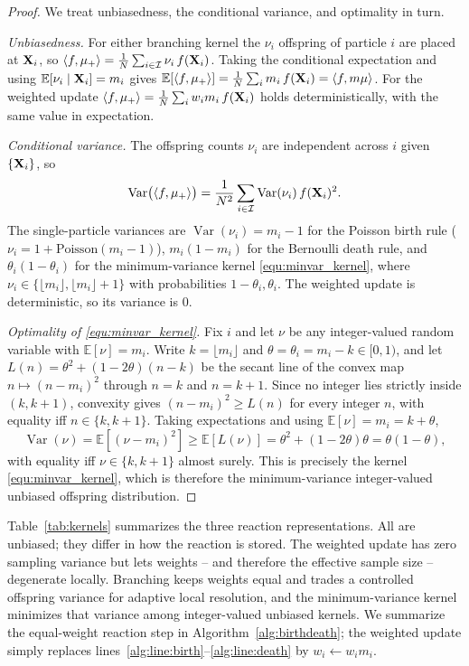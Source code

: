 \documentclass[a4paper,fleqn]{cas-sc}
\theoremstyle{definition}
\theoremstyle{remark}
\begin{document}
\begin{proof}
We treat unbiasedness, the conditional variance, and optimality in turn.

\emph{Unbiasedness.} For either branching kernel the $\nu_i$ offspring of particle $i$ are placed at $\mathbf{X}_i$, so
$\langle f,\mu_+\rangle=\frac1N\sum_{i\in\mathcal I}\nu_i\,f(\mathbf{X}_i)$. Taking the conditional expectation and using
$\mathbb E[\nu_i\mid\mathbf{X}_i]=m_i$ gives
$\mathbb E[\langle f,\mu_+\rangle]=\frac1N\sum_i m_i\,f(\mathbf{X}_i)=\langle f,m\mu\rangle$. For the weighted update
$\langle f,\mu_+\rangle=\frac1N\sum_i w_i m_i\,f(\mathbf{X}_i)$ holds deterministically, with the same value in
expectation.

\emph{Conditional variance.} The offspring counts $\nu_i$ are independent across $i$ given $\{\mathbf{X}_i\}$, so
\[
\operatorname{Var}\!\big(\langle f,\mu_+\rangle\big)
=\frac1{N^2}\sum_{i\in\mathcal I}\operatorname{Var}(\nu_i)\,f(\mathbf{X}_i)^2 .
\]
The single-particle variances are $\operatorname{Var}(\nu_i)=m_i-1$ for the Poisson birth rule
($\nu_i=1+\mathrm{Poisson}(m_i-1)$), $m_i(1-m_i)$ for the Bernoulli death rule, and $\theta_i(1-\theta_i)$ for the
minimum-variance kernel \eqref{equ:minvar_kernel}, where $\nu_i\in\{\lfloor m_i\rfloor,\lfloor m_i\rfloor+1\}$
with probabilities $1-\theta_i,\theta_i$. The weighted update is deterministic, so its variance is $0$.

\emph{Optimality of \eqref{equ:minvar_kernel}.} Fix $i$ and let $\nu$ be any integer-valued random variable with
$\mathbb E[\nu]=m_i$. Write $k=\lfloor m_i\rfloor$ and $\theta=\theta_i=m_i-k\in[0,1)$, and let
$L(n)=\theta^2+(1-2\theta)(n-k)$ be the secant line of the convex map $n\mapsto(n-m_i)^2$ through $n=k$ and
$n=k+1$. Since no integer lies strictly inside $(k,k+1)$, convexity gives $(n-m_i)^2\ge L(n)$ for every integer
$n$, with equality iff $n\in\{k,k+1\}$. Taking expectations and using $\mathbb E[\nu]=m_i=k+\theta$,
\[
\operatorname{Var}(\nu)=\mathbb E[(\nu-m_i)^2]\ge\mathbb E[L(\nu)]
=\theta^2+(1-2\theta)\theta=\theta(1-\theta),
\]
with equality iff $\nu\in\{k,k+1\}$ almost surely. This is precisely the kernel \eqref{equ:minvar_kernel}, which
is therefore the minimum-variance integer-valued unbiased offspring distribution.
\end{proof}
Table~\ref{tab:kernels} summarizes the three reaction representations. All are unbiased; they differ in how the
reaction is stored. The weighted update has zero sampling variance but lets weights -- and therefore the
effective sample size -- degenerate locally. Branching keeps weights equal and trades a controlled offspring
variance for adaptive local resolution, and the minimum-variance kernel minimizes that variance among
integer-valued unbiased kernels. We summarize the equal-weight reaction step in Algorithm~\ref{alg:birthdeath};
the weighted update simply replaces lines~\ref{alg:line:birth}--\ref{alg:line:death} by $w_i\leftarrow w_i m_i$.
\end{document}

